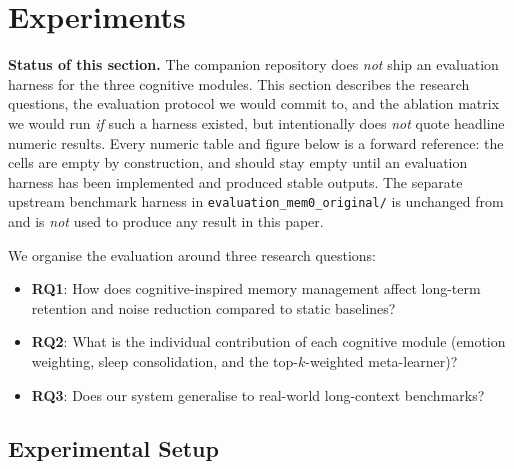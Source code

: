 \section{Experiments}
\label{sec:experiments}

\noindent\textbf{Status of this section.}
The companion repository does \emph{not} ship an evaluation harness for
the three cognitive modules. This section describes the research
questions, the evaluation protocol we would commit to, and the ablation
matrix we would run \emph{if} such a harness existed, but intentionally
does \emph{not} quote headline numeric results. Every numeric table and
figure below is a forward reference: the cells are empty by construction,
and should stay empty until an evaluation harness has been implemented
and produced stable outputs. The separate upstream benchmark harness in
\texttt{evaluation\_mem0\_original/} is unchanged from
\cite{mem0} and is \emph{not} used to produce any result in this paper.

We organise the evaluation around three research questions:
\begin{itemize}
    \item \textbf{RQ1}: How does cognitive-inspired memory management affect long-term retention and noise reduction compared to static baselines?
    \item \textbf{RQ2}: What is the individual contribution of each cognitive module (emotion weighting, sleep consolidation, and the top-$k$-weighted meta-learner)?
    \item \textbf{RQ3}: Does our system generalise to real-world long-context benchmarks?
\end{itemize}

\subsection{Experimental Setup}
\label{subsec:setup}

